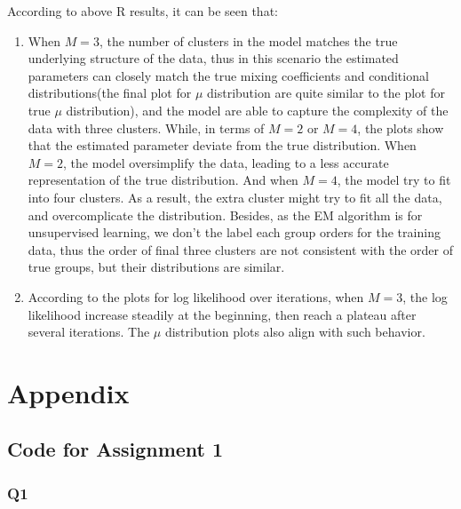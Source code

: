 \documentclass[
]{article}
\begin{document}
According to above R results, it can be seen that:

\begin{enumerate}
\def\labelenumi{\arabic{enumi})}
\item
  When \(M=3\), the number of clusters in the model matches the true
  underlying structure of the data, thus in this scenario the estimated
  parameters can closely match the true mixing coefficients and
  conditional distributions(the final plot for \(\mu\) distribution are
  quite similar to the plot for true \(\mu\) distribution), and the
  model are able to capture the complexity of the data with three
  clusters. While, in terms of \(M=2\) or \(M=4\), the plots show that
  the estimated parameter deviate from the true distribution. When
  \(M=2\), the model oversimplify the data, leading to a less accurate
  representation of the true distribution. And when \(M=4\), the model
  try to fit into four clusters. As a result, the extra cluster might
  try to fit all the data, and overcomplicate the distribution. Besides,
  as the EM algorithm is for unsupervised learning, we don't the label
  each group orders for the training data, thus the order of final three
  clusters are not consistent with the order of true groups, but their
  distributions are similar.
\item
  According to the plots for log likelihood over iterations, when
  \(M=3\), the log likelihood increase steadily at the beginning, then
  reach a plateau after several iterations. The \(\mu\) distribution
  plots also align with such behavior.
\end{enumerate}

\hypertarget{appendix}{%
\section{Appendix}\label{appendix}}

\hypertarget{code-for-assignment-1}{%
\subsection{Code for Assignment 1}\label{code-for-assignment-1}}

\hypertarget{q1-1}{%
\subsubsection{Q1}\label{q1-1}}
\end{document}

